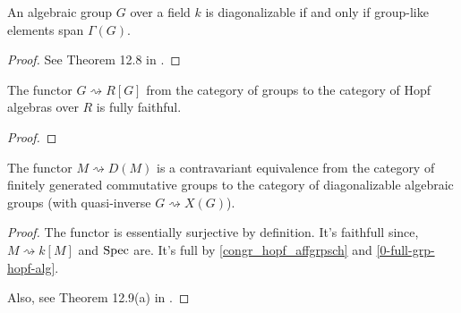 \begin{theorem}
  \label{0-diag-iff-grp-like-span}
  \leanok

  An algebraic group $G$ over a field $k$ is diagonalizable if and only if group-like elements span $\Gamma(G)$.
\end{theorem}
\begin{proof}

  See Theorem 12.8 in \cite{Milne_2017}.
\end{proof}


\begin{proposition}
  \label{0-full-grp-hopf-alg}
  \uses{}

  The functor $G \rightsquigarrow R[G]$ from the category of groups to the category of Hopf algebras over $R$ is fully faithful.
\end{proposition}
\begin{proof}

\end{proof}


\begin{theorem}
  \label{0-fg-comm-grp-equiv-diag-grp-sch}
  The functor $M\rightsquigarrow D(M)$ is a contravariant equivalence
  from the category of finitely generated commutative groups to the category of
  diagonalizable algebraic groups (with quasi-inverse $G \rightsquigarrow X(G)$).
\end{theorem}
\begin{proof}

  The functor is essentially surjective by definition.
  It's faithfull since, $M\rightsquigarrow k[M]$ and $\operatorname{Spec}$ are.
  It's full by \ref{congr_hopf_affgrpsch} and \ref{0-full-grp-hopf-alg}.

  Also, see Theorem 12.9(a) in \cite{Milne_2017}.
\end{proof}
